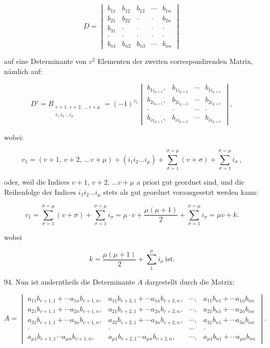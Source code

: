 \[
D =
\begin{vmatrix}
b_{11} & b_{12} & b_{13} & \cdots & b_{1n} \\
b_{21} & b_{22} & \cdot & \cdot & b_{2n} \\
b_{31} & \cdot & \cdot & \cdot & \cdot \\
\cdot & \cdot & \cdot & \cdot & \cdot \\
b_{n1} & b_{n2} & b_{n3} & \cdots & b_{nn}
\end{vmatrix}
\]

auf eine Determinante von $v^2$ Elementen der zweiten correspondirenden Matrix, n\"amlich auf:

\[
D' = B_{\substack{v+1,\,v+2,\,\ldots\,v+\mu\\i_1\ i_2\ \ldots i_\mu}} = (-1)^{v_1}
\begin{vmatrix}
b_{1i_{\mu+1}}, & b_{1i_{\mu+2}} & \cdots & b_{1i_{\mu+v}} \\
b_{2i_{\mu+1}}, & b_{2i_{\mu+2}} & \cdots & b_{2i_{\mu+v}} \\
\cdot & \cdot & \cdots & \cdot \\
b_{vi_{\mu+1}}, & b_{vi_{\mu+2}} & \cdots & b_{vi_{\mu+v}}
\end{vmatrix},
\]

wobei:


\[
v_1 = (v+1,\ v+2,\ \ldots v+\mu) + (i_1 i_2 \ldots i_\mu) + \sum_{\sigma=1}^{\sigma=\mu}(v+\sigma) + \sum_{\sigma=1}^{\sigma=\mu} i_\sigma\,,
\]

oder, weil die Indices $v+1$, $v+2$, $\ldots v+\mu$ a priori gut geordnet sind, und die Reihenfolge der Indices $i_1 i_2 \ldots i_\mu$ stets als gut geordnet vorausgesetzt werden kann:

\[
v_1 = \sum_{\sigma=1}^{\sigma=\mu}(v+\sigma) + \sum_{\sigma=1}^{\sigma=\mu} i_\sigma = \mu\cdot v + \frac{\mu(\mu+1)}{2} + \sum_{\sigma=1}^{\sigma=\mu} i_\sigma = \mu v + k.
\]

wobei

\[
k = \frac{\mu(\mu+1)}{2} + \sum_{1}^{\mu} i_\sigma\ \text{ist.}
\]

94. Nun ist anderntheils die Determinante $A$ dargestellt durch die Matrix:

\[
A =
\begin{vmatrix}
a_{11}b_{v+1,1}+\cdots a_{1n}b_{v+1,n}, & a_{11}b_{v+2,1}+\cdots a_{1n}b_{v+2,n}, & \cdots, & a_{11}b_{n1}+\cdots a_{1n}b_{nn} \\
a_{21}b_{v+1,1}+\cdots a_{2n}b_{v+1,n}, & a_{21}b_{v+2,1}+\cdots a_{2n}b_{v+2,n}, & \cdots, & a_{21}b_{n1}+\cdots a_{2n}b_{nn} \\
a_{31}b_{v+1,1}+\cdots a_{3n}b_{v+1,n}, & a_{32}b_{v+2,1}+\cdots a_{3n}b_{v+2,n}, & \cdots, & a_{31}b_{n1}+\cdots a_{3n}b_{nn} \\%
\cdot & \cdot & \cdots & \cdot \\
a_{\mu 1}b_{v+1,1}\cdots a_{\mu n}b_{v+1,n}, & a_{\mu 1}b_{v+2,1}\cdots a_{\mu n}b_{v+2,n}, & \cdots, & a_{\mu 1}b_{n1}+\cdots a_{\mu n}b_{nn}
\end{vmatrix}.
\]

